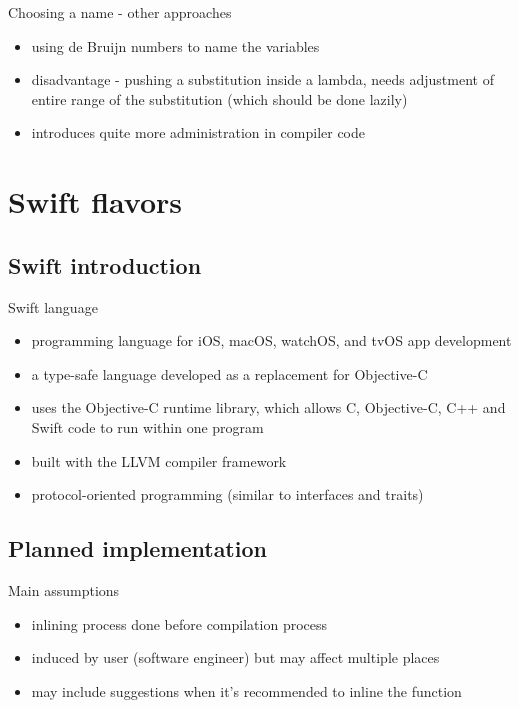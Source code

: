 \documentclass[hyperref={pdfpagelabels=false},xcolor={dvipsnames},compress,table,usenames,dvipsnames]{beamer}
\begin{document}
    \begin{frame}[fragile]{Choosing a name - other approaches}
        \begin{itemize}
            \item using de Bruijn numbers to name the variables\pause
            \item disadvantage - pushing a substitution inside a lambda, needs adjustment of entire range of the substitution (which should be done lazily)\pause
            \item introduces quite more administration in compiler code
        \end{itemize}
    \end{frame}

    \section{Swift flavors}

    \subsection{Swift introduction}

    \begin{frame}[fragile]{Swift language}
        \begin{itemize}
            \item programming language for iOS, macOS, watchOS, and tvOS app development\pause
            \item a type-safe language developed as a replacement for Objective-C\pause
            \item uses the Objective-C runtime library, which allows C, Objective-C, C++ and Swift code to run within one program\pause
            \item built with the LLVM compiler framework\pause
            \item protocol-oriented programming (similar to interfaces and traits)
        \end{itemize}
    \end{frame}

    \subsection{Planned implementation}

    \begin{frame}[fragile]{Main assumptions}
        \begin{itemize}
            \item inlining process done before compilation process\pause
            \item induced by user (software engineer) but may affect multiple places\pause
            \item may include suggestions when it's recommended to inline the function
        \end{itemize}
    \end{frame}
\end{document}
